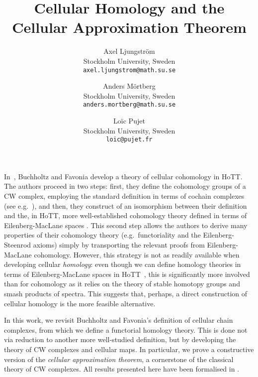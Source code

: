 \documentclass[a4page]{article}
\title{Cellular Homology and the Cellular Approximation Theorem}
\author{
  Axel Ljungström\\
  \footnotesize{Stockholm University, Sweden}\\
  \footnotesize{\texttt{axel.ljungstrom@math.su.se}}
  \and
  Anders Mörtberg\\
  \footnotesize{Stockholm University, Sweden}\\
  \footnotesize{\texttt{anders.mortberg@math.su.se}}
  \and
  Loïc Pujet\\
  \footnotesize{Stockholm University, Sweden}\\
  \footnotesize{\texttt{loic@pujet.fr}}
}
\date{}
\begin{document}
\maketitle
\vspace{-.5cm}
%
In~\cite{BuchholtzFavonia18}, Buchholtz and Favonia develop a theory
of cellular cohomology in HoTT. The authors proceed in two steps:
%
first, they define the cohomology groups of a CW complex, employing the
standard definition in terms of cochain complexes (see e.g.\ \cite{May1999}),
and then, they construct of an isomorphism between their definition and
the, in HoTT, more well-established cohomology theory defined in terms of Eilenberg-MacLane
spaces \cite{ShulmanBlog13,LicataFinster14,CavalloMsc15}.
%
This second step allows the authors to derive many properties of their
cohomology theory (e.g.\ functoriality and the Eilenberg-Steenrod axioms)
simply by transporting the relevant proofs from Eilenberg-MacLane cohomology.
%
However, this strategy is not as readily available when developing cellular \emph{homology}:
%
even though we can define homology theories in terms of Eilenberg-MacLane spaces in HoTT~\cite{graham18,christensen2020hurewicz,FlorisPhd,spectralsequences}, this is significantly more involved than for cohomology
as it relies on the theory of stable homotopy groups and smash products of spectra. This suggests that, perhaps, a direct construction of cellular homology is the more feasible alternative.

In this work, we revisit Buchholtz and Favonia's
definition of cellular chain complexes, from which we define a functorial homology theory. This is done not via reduction to another more
well-studied definition, but by developing the theory of CW complexes and
cellular maps.
%
In particular, we prove a constructive version of the \emph{cellular
  approximation theorem}, a cornerstone of the classical theory of CW complexes. All results presented here have been formalised in \CubicalAgda \cite{cubicalagda2}.

\end{document}
